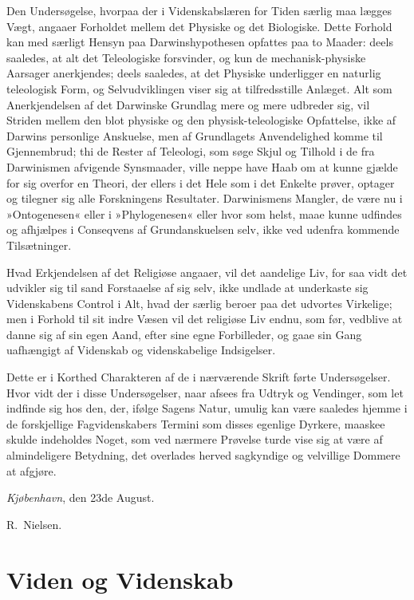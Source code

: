 \documentclass[12pt]{book}
\begin{document}
Den Undersøgelse, hvorpaa der i Videnskabslæren for Tiden særlig maa
lægges Vægt, angaaer Forholdet mellem det Physiske og det Biologiske.
Dette Forhold kan med særligt Hensyn paa Darwinshypothesen opfattes paa
to Maader: deels saaledes, at alt det Teleologiske forsvinder, og kun de
mechanisk-physiske Aarsager anerkjendes; deels saaledes, at det Physiske
underligger en naturlig teleologisk Form, og Selvudviklingen viser sig at
tilfredsstille Anlæget. Alt som Anerkjendelsen af det Darwinske Grundlag
mere og mere udbreder sig, vil Striden mellem den blot physiske og den
physisk-teleologiske Opfattelse, ikke af Darwins personlige Anskuelse,
men af Grundlagets Anvendelighed komme til Gjennembrud; thi de Rester af
Teleologi, som søge Skjul og Tilhold i de fra Darwinismen afvigende
Synsmaader, ville neppe have Haab om at kunne gjælde for sig overfor en
Theori, der ellers i det Hele som i det Enkelte prøver, optager og
tilegner sig alle Forskningens Resultater. Darwinismens Mangler, de være
nu i »Ontogenesen« eller i »Phylogenesen« eller hvor som helst, maae
kunne udfindes og afhjælpes i Conseqvens af Grundanskuelsen selv, ikke
ved udenfra kommende Tilsætninger.

Hvad Erkjendelsen af det Religiøse angaaer, vil det aandelige Liv, for
saa vidt det udvikler sig til sand Forstaaelse af sig selv, ikke undlade
at underkaste sig Videnskabens Control i Alt, hvad der særlig beroer paa
det udvortes Virkelige; men i Forhold til sit indre Væsen vil det
religiøse Liv endnu, som før, vedblive at danne sig af sin egen Aand,
efter sine egne Forbilleder, og gaae sin Gang uafhængigt af Videnskab og
videnskabelige Indsigelser.

Dette er i Korthed Charakteren af de i nærværende Skrift førte
Undersøgelser. Hvor vidt der i disse Undersøgelser, naar afsees fra
Udtryk og Vendinger, som let indfinde sig hos den, der, ifølge Sagens
Natur, umulig kan være saaledes hjemme i de forskjellige Fagvidenskabers
Termini som disses egenlige Dyrkere, maaskee skulde indeholdes Noget, som
ved nærmere Prøvelse turde vise sig at være af almindeligere Betydning,
det overlades herved sagkyndige og velvillige Dommere at afgjøre.

\bigskip
\noindent \emph{Kjøbenhavn}, den 23de August.
\nopagebreak
\par\hfill R.\ Nielsen.



\part{Viden og Videnskab}
\end{document}
